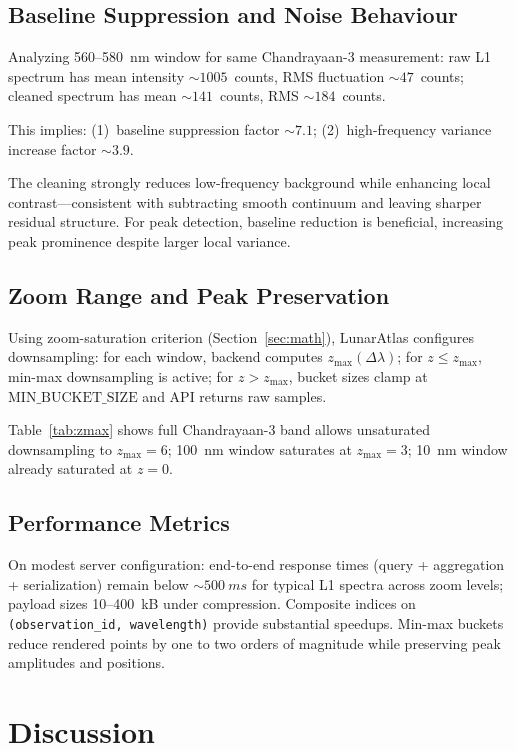 \documentclass[11pt,a4paper]{article}
\begin{document}
\subsection{Baseline Suppression and Noise Behaviour}

Analyzing 560--580~nm window for same Chandrayaan-3 measurement: raw L1 spectrum has mean intensity $\sim 1005$~counts, RMS fluctuation $\sim 47$~counts; cleaned spectrum has mean $\sim 141$~counts, RMS $\sim 184$~counts.

This implies: (1)~baseline suppression factor $\sim 7.1$; (2)~high-frequency variance increase factor $\sim 3.9$.

The cleaning strongly reduces low-frequency background while enhancing local contrast—consistent with subtracting smooth continuum and leaving sharper residual structure. For peak detection, baseline reduction is beneficial, increasing peak prominence despite larger local variance.

\subsection{Zoom Range and Peak Preservation}

Using zoom-saturation criterion (Section~\ref{sec:math}), LunarAtlas configures downsampling: for each window, backend computes $z_{\max}(\Delta\lambda)$; for $z \le z_{\max}$, min-max downsampling is active; for $z > z_{\max}$, bucket sizes clamp at $\text{MIN\_BUCKET\_SIZE}$ and API returns raw samples.

Table~\ref{tab:zmax} shows full Chandrayaan-3 band allows unsaturated downsampling to $z_{\max}=6$; 100~nm window saturates at $z_{\max}=3$; 10~nm window already saturated at $z=0$.

\subsection{Performance Metrics}

On modest server configuration: end-to-end response times (query + aggregation + serialization) remain below $\sim \SI{500}{ms}$ for typical L1 spectra across zoom levels; payload sizes 10--400~kB under compression. Composite indices on \texttt{(observation\_id, wavelength)} provide substantial speedups. Min-max buckets reduce rendered points by one to two orders of magnitude while preserving peak amplitudes and positions.

\section{Discussion}
\label{sec:discussion}
\end{document}
